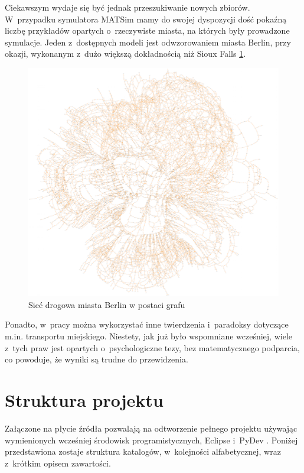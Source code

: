 \documentclass[twoside,12pt]{report}
\begin{document}
Ciekawszym wydaje się być jednak przeszukiwanie nowych zbiorów. W~przypadku symulatora MATSim mamy do swojej dyspozycji dość pokaźną liczbę przykładów opartych o~rzeczywiste miasta, na których były prowadzone symulacje. Jeden z~dostępnych modeli jest odwzorowaniem miasta Berlin, przy okazji, wykonanym z~dużo większą dokładnością niż Sioux Falls \ref{berlin}.

\begin{figure}[htbp]
\centering
\includegraphics[width=\textwidth]{img/berlin2}
\caption{Sieć drogowa miasta Berlin w postaci grafu}
\label{berlin}
\end{figure}

Ponadto, w~pracy można wykorzystać inne twierdzenia i~paradoksy dotyczące m.in. transportu miejskiego. Niestety, jak już było wspomniane wcześniej, wiele z~tych praw jest opartych o~psychologiczne tezy, bez matematycznego podparcia, co powoduje, że wyniki są trudne do przewidzenia.


\section{Struktura projektu}

Załączone na płycie źródła pozwalają na odtworzenie pełnego projektu używając wymienionych wcześniej środowisk programistycznych, Eclipse \cite{eclipse} i~PyDev \cite{pydev}. Poniżej przedstawiona zostaje struktura katalogów, w~kolejności alfabetycznej, wraz z~krótkim opisem zawartości.
\end{document}
